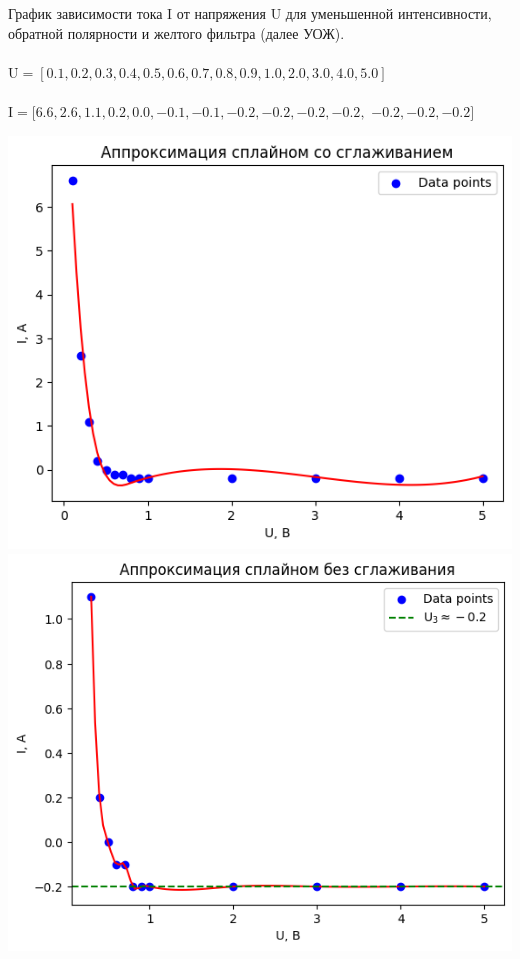 \documentclass[12pt,openany]{book}
\begin{document}
\newpage

\noindent График зависимости тока I от напряжения U для уменьшенной интенсивности, 
обратной полярности и желтого фильтра (далее УОЖ).\\\\
$\text{U} = [0.1, 0.2, 0.3, 0.4, 0.5, 0.6, 0.7, 0.8, 0.9, 1.0, 2.0, 3.0, 4.0, 5.0]$\\\\
$\text{I} = [6.6, 2.6, 1.1, 0.2, 0.0, -0.1, -0.1, -0.2, -0.2, -0.2, -0.2,$
$-0.2, -0.2, -0.2]$\\

\begin{center}
    \includegraphics[scale=0.59]{K4-DRY1} \\

    \includegraphics[scale=0.59]{K4-DRY2} \\
\end{center}
\end{document}
